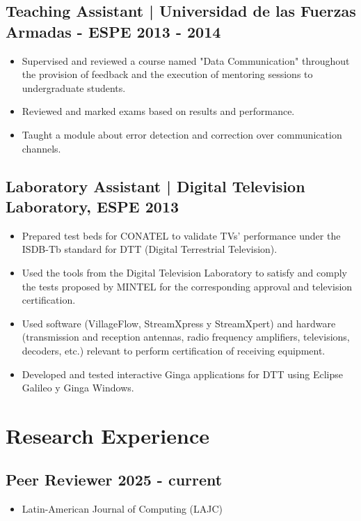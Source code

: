 \documentclass[11pt,a4paper]{article}
\begin{document}
\vspace{0.5em}
\subsection*{Teaching Assistant | Universidad de las Fuerzas Armadas - ESPE \hfill 2013 - 2014}
\begin{itemize}
    \item Supervised and reviewed a course named "Data Communication" throughout the provision of feedback and the execution of mentoring sessions to undergraduate students.
    \item Reviewed and marked exams based on results and performance.
    \item Taught a module about error detection and correction over communication channels.
\end{itemize}

\vspace{0.5em}
\subsection*{Laboratory Assistant | Digital Television Laboratory, ESPE \hfill 2013}
\begin{itemize}
    \item Prepared test beds for CONATEL to validate TVs' performance under the ISDB-Tb standard for DTT (Digital Terrestrial Television).
    \item Used the tools from the Digital Television Laboratory to satisfy and comply the tests proposed by MINTEL for the corresponding approval and television certification.
    \item Used software (VillageFlow, StreamXpress y StreamXpert) and hardware (transmission and reception antennas, radio frequency amplifiers, televisions, decoders, etc.) relevant to perform certification of receiving equipment.
    \item Developed and tested interactive Ginga applications for DTT using Eclipse Galileo y Ginga Windows.
\end{itemize}

\section*{Research Experience}

\subsection*{Peer Reviewer \hfill 2025 - current}
\begin{itemize}
    \item Latin-American Journal of Computing (LAJC)
\end{itemize}
\end{document}
